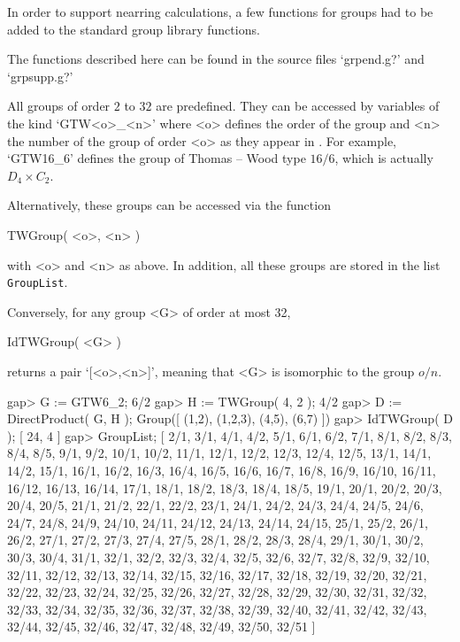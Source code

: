 %
%

In order to support nearring calculations, a few functions for groups had to 
be added to the standard {\GAP} group library functions. 

The functions described here can be found in the source files
`grpend.g?' and `grpsupp.g?'



All groups of order $2$ to $32$ are predefined. They can be accessed
by variables of the kind `GTW<o>\_{<n>}' where <o> defines the order
of the group and <n> the number of the group of order <o> as they
appear in \cite{thomaswood80:GT} . For example, `GTW16\_6' defines the
group of Thomas -- Wood type $16/6$, which is actually $D_4 \times
C_2$.

Alternatively, these groups can be accessed via the function

\>TWGroup( <o>, <n> )

with <o> and <n> as above. In addition, all these groups are stored in the
list {\tt GroupList}.

Conversely, for any group <G> of order at most 32,

\>IdTWGroup( <G> )

returns a pair `[<o>,<n>]', meaning that <G> is isomorphic to the group
$o/n$.

\beginexample
    gap> G := GTW6_2;               
    6/2
    gap> H := TWGroup( 4, 2 );
    4/2
    gap> D := DirectProduct( G, H );
    Group([ (1,2), (1,2,3), (4,5), (6,7) ])
    gap> IdTWGroup( D );
    [ 24, 4 ]
    gap> GroupList;
    [ 2/1, 3/1, 4/1, 4/2, 5/1, 6/1, 6/2, 7/1, 8/1, 8/2, 8/3, 8/4, 8/5, 
      9/1, 9/2, 10/1, 10/2, 11/1, 12/1, 12/2, 12/3, 12/4, 12/5, 13/1, 
      14/1, 14/2, 15/1, 16/1, 16/2, 16/3, 16/4, 16/5, 16/6, 16/7, 16/8, 
      16/9, 16/10, 16/11, 16/12, 16/13, 16/14, 17/1, 18/1, 18/2, 18/3, 
      18/4, 18/5, 19/1, 20/1, 20/2, 20/3, 20/4, 20/5, 21/1, 21/2, 22/1, 
      22/2, 23/1, 24/1, 24/2, 24/3, 24/4, 24/5, 24/6, 24/7, 24/8, 24/9, 
      24/10, 24/11, 24/12, 24/13, 24/14, 24/15, 25/1, 25/2, 26/1, 26/2, 
      27/1, 27/2, 27/3, 27/4, 27/5, 28/1, 28/2, 28/3, 28/4, 29/1, 30/1, 
      30/2, 30/3, 30/4, 31/1, 32/1, 32/2, 32/3, 32/4, 32/5, 32/6, 32/7, 
      32/8, 32/9, 32/10, 32/11, 32/12, 32/13, 32/14, 32/15, 32/16, 32/17, 
      32/18, 32/19, 32/20, 32/21, 32/22, 32/23, 32/24, 32/25, 32/26, 
      32/27, 32/28, 32/29, 32/30, 32/31, 32/32, 32/33, 32/34, 32/35, 
      32/36, 32/37, 32/38, 32/39, 32/40, 32/41, 32/42, 32/43, 32/44, 
      32/45, 32/46, 32/47, 32/48, 32/49, 32/50, 32/51 ]
\endexample

